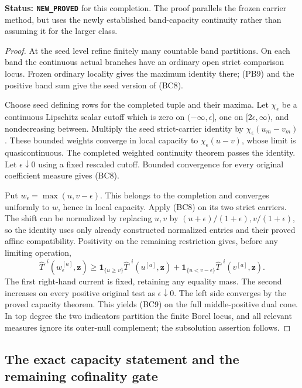 \noindent\textbf{Status: \texttt{NEW\_PROVED}} for this completion.
The proof parallels the frozen carrier method, but uses the
newly established band-capacity continuity rather than assuming
it for the larger class.

\begin{proof}
At the seed level refine finitely many countable band partitions.
On each band the continuous actual branches have an ordinary
open strict comparison locus. Frozen ordinary locality gives
the maximum identity there; (PB9) and the positive band sum give
the seed version of (BC8).

Choose seed defining rows for the completed tuple and their
maxima. Let $\chi_\epsilon$ be a continuous Lipschitz scalar
cutoff which is zero on $(-\infty,\epsilon]$, one on
$[2\epsilon,\infty)$, and nondecreasing between. Multiply the
seed strict-carrier identity by
$\chi_\epsilon(u_m-v_m)$. These bounded weights converge in
local capacity to $\chi_\epsilon(u-v)$, whose limit is
quasicontinuous. The completed weighted continuity theorem
passes the identity. Let $\epsilon\downarrow0$ using a fixed
rescaled cutoff. Bounded convergence for every original
coefficient measure gives (BC8).

Put $w_\epsilon=\max(u,v-\epsilon)$. This belongs to the
completion and converges uniformly to $w$, hence in local
capacity. Apply (BC8) on its two strict carriers. The shift
can be normalized by replacing $u,v$ by
$(u+\epsilon)/(1+\epsilon),v/(1+\epsilon)$, so the identity
uses only already constructed normalized entries and their
proved affine compatibility. Positivity on the remaining
restriction gives, before any limiting operation,
\[
 \widehat T^{,i}(w_\epsilon^{[a]},\mathbf z)
 \geq\mathbf1_{\{u\geq v\}}\widehat T^{,i}(u^{[a]},\mathbf z)
       +\mathbf1_{\{u<v-\epsilon\}}\widehat T^{,i}(v^{[a]},\mathbf z).
\]
The first right-hand current is fixed, retaining any equality
mass. The second increases on every positive original test as
$\epsilon\downarrow0$. The left side converges by the proved
capacity theorem. This yields (BC9) on the full middle-positive
dual cone. In top degree the two indicators partition the
finite Borel locus, and all relevant measures ignore its
outer-null complement; the subsolution assertion follows.
\end{proof}

\subsection{The exact capacity statement and the remaining cofinality gate}

